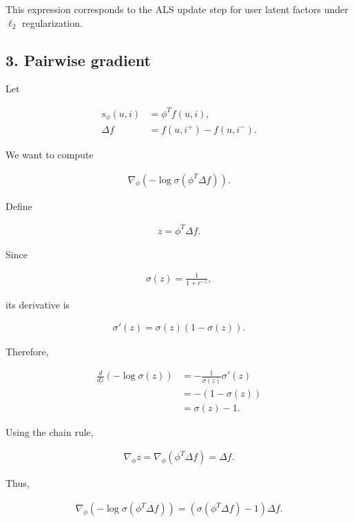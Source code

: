 \documentclass[11pt]{article}
\begin{document}
\begin{appendices}
This expression corresponds to the ALS update step for user latent factors under $\ell_2$ regularization.

\vspace{1cm}

\subsection*{3. Pairwise gradient}

Let

\begin{align*}
    s_\phi(u,i) &= \phi^T f(u,i), \\
    \Delta f &= f(u,i^+) - f(u,i^-).
\end{align*}

We want to compute

\begin{align*}
    \nabla_\phi \left(-\log \sigma(\phi^T \Delta f)\right).
\end{align*}

Define

\begin{align*}
    z = \phi^T \Delta f.
\end{align*}

Since

\begin{align*}
    \sigma(z) = \frac{1}{1+e^{-z}},
\end{align*}

its derivative is

\begin{align*}
    \sigma'(z) = \sigma(z)(1-\sigma(z)).
\end{align*}

Therefore,

\begin{align*}
    \frac{d}{dz}\left(-\log\sigma(z)\right)
    &=
    -\frac{1}{\sigma(z)}\sigma'(z) \\
    &=
    -(1-\sigma(z)) \\
    &=
    \sigma(z)-1.
\end{align*}

Using the chain rule,

\begin{align*}
    \nabla_\phi z = \nabla_\phi (\phi^T \Delta f) = \Delta f.
\end{align*}

Thus,

\begin{align*}
    \nabla_\phi \left(-\log\sigma(\phi^T \Delta f)\right)
    =
    (\sigma(\phi^T \Delta f)-1)\Delta f.
\end{align*}



\end{appendices}
\end{document}
